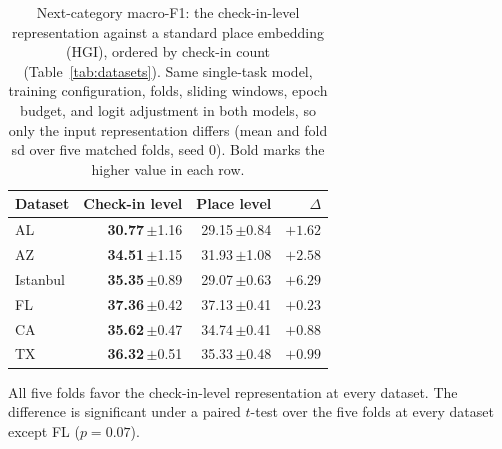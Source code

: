 \providecommand{\sd}[1]{\,{\scriptsize$\pm$#1}}
\begin{table}[!t]
\caption{Next-category macro-F1: the check-in-level representation against a standard place
embedding (HGI), ordered by check-in count (Table~\ref{tab:datasets}). Same single-task model,
training configuration, folds, sliding windows, epoch budget, and logit adjustment in both models,
so only the input representation differs (mean and fold sd over five matched folds, seed 0). Bold marks
the higher value in each row.}
\label{tab:substrate}
\centering
\begin{tabular}{l r r r}
\hline
\textbf{Dataset} & \textbf{Check-in level} & \textbf{Place level} & \textbf{$\Delta$} \\
\hline
AL & \textbf{30.77}\sd{1.16} & 29.15\sd{0.84} & $+1.62$ \\
AZ & \textbf{34.51}\sd{1.15} & 31.93\sd{1.08} & $+2.58$ \\
Istanbul & \textbf{35.35}\sd{0.89} & 29.07\sd{0.63} & $+6.29$ \\
FL & \textbf{37.36}\sd{0.42} & 37.13\sd{0.41} & $+0.23$ \\
CA & \textbf{35.62}\sd{0.47} & 34.74\sd{0.41} & $+0.88$ \\
TX & \textbf{36.32}\sd{0.51} & 35.33\sd{0.48} & $+0.99$ \\
\hline
\end{tabular}

\vspace{2pt}
{\footnotesize All five folds favor the check-in-level representation at every dataset. The
difference is significant under a paired $t$-test over the five folds at every dataset except FL ($p=0.07$).}
\end{table}

